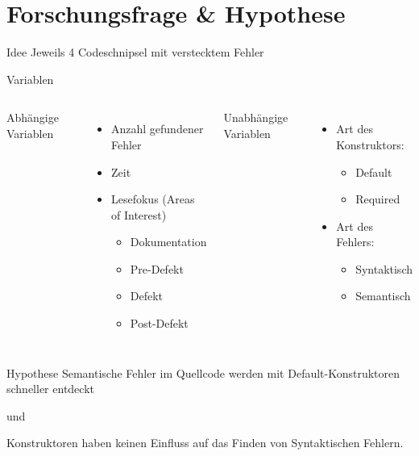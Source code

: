\documentclass[10pt]{beamer}
\begin{document}
\section{Forschungsfrage \& Hypothese}

	\begin{frame}{Idee}
		Jeweils 4 Codeschnipsel mit verstecktem Fehler
	\end{frame}

	\begin{frame}{Variablen}
		\begin{columns}[T,onlytextwidth]
	
			Abhängige Variablen
			\begin{itemize}
				\item Anzahl gefundener Fehler
				\item Zeit
				\item Lesefokus (Areas of Interest)
				\begin{itemize}
					\item Dokumentation
					\item Pre-Defekt
					\item Defekt
					\item Post-Defekt
				\end{itemize}
			\end{itemize}
		
			Unabhängige Variablen
			\begin{itemize}
				\item Art des Konstruktors:
				\begin{itemize}
					\item Default
					\item Required
				\end{itemize}
				\item Art des Fehlers:
				\begin{itemize}
					\item Syntaktisch
					\item Semantisch
				\end{itemize}
			\end{itemize}
		\end{columns}	
	\end{frame}

	\begin{frame}[standout]{Hypothese}
		Semantische Fehler im Quellcode werden mit Default-Konstruktoren schneller entdeckt
		\begin{center}und\end{center}
		Konstruktoren haben keinen Einfluss auf das Finden von Syntaktischen Fehlern.
	\end{frame}
\end{document}
